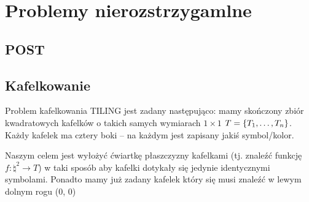 \section{Problemy nierozstrzygamlne}

\subsection{POST}

\subsection{Kafelkowanie}

Problem kafelkowania \textsc{TILING} jest zadany następująco: mamy skończony zbiór kwadratowych kafelków o takich samych wymiarach \( 1 \times 1 \) \( T = \set{T_1, \dots, T_n} \).
Każdy kafelek ma cztery boki -- na każdym jest zapisany jakiś symbol/kolor. 

Naszym celem jest wyłożyć ćwiartkę płaszczyzny kafelkami (tj. znaleźć funkcję \( f : \natural^2 \rightarrow T \)) w taki sposób aby kafelki dotykały się jedynie identycznymi symbolami. Ponadto mamy już zadany kafelek który się musi znaleźć w lewym dolnym rogu (0, 0)

